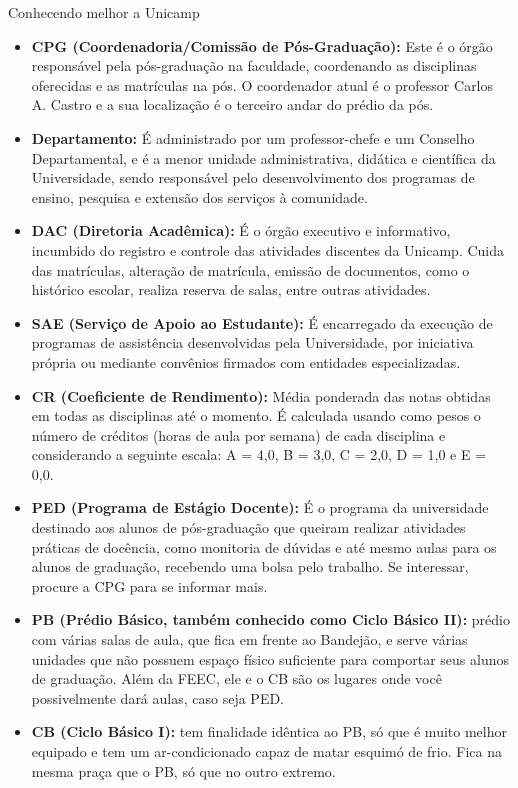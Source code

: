 \begin{story}{Conhecendo melhor a Unicamp}
\begin{itemize}
\item \textbf{CPG (Coordenadoria/Comissão de Pós-Graduação):} Este é o órgão responsável pela pós-graduação na faculdade, coordenando as disciplinas oferecidas e as matrículas na pós. O coordenador atual é o professor Carlos A. Castro e a sua localização é o terceiro andar do prédio da pós.

\item \textbf{Departamento:} É administrado por um professor-chefe e um Conselho Departamental, e é a menor unidade administrativa, didática e científica da Universidade, sendo responsável pelo desenvolvimento dos programas de ensino, pesquisa e extensão dos serviços à comunidade.

\item \textbf{DAC (Diretoria Acadêmica):} É o órgão executivo e informativo, incumbido do registro e controle das atividades discentes da Unicamp. Cuida das matrículas, alteração de matrícula, emissão de documentos, como o histórico escolar, realiza reserva de salas, entre outras atividades.

\item \textbf{SAE (Serviço de Apoio ao Estudante):} É encarregado da execução de programas de assistência desenvolvidas pela Universidade, por iniciativa própria ou mediante convênios firmados com entidades especializadas.

\item \textbf{CR (Coeficiente de Rendimento):} Média ponderada das notas obtidas em todas as disciplinas até o momento. É calculada usando como pesos o número de créditos (horas de aula por semana) de cada disciplina e considerando a seguinte escala: A = 4,0, B = 3,0, C = 2,0, D = 1,0 e E = 0,0.

\item \textbf{PED (Programa de Estágio Docente):} É o programa da universidade destinado aos alunos de pós-graduação que queiram realizar atividades práticas de docência, como monitoria de dúvidas e até mesmo aulas para os alunos de graduação, recebendo uma bolsa pelo trabalho. Se interessar, procure a CPG para se informar mais.

\item \textbf{PB (Prédio Básico, também conhecido como Ciclo Básico II):} prédio com várias salas de aula, que fica em frente ao Bandejão, e serve várias unidades que não possuem espaço físico suficiente para comportar seus alunos de graduação. Além da FEEC, ele e o CB são os lugares onde você possivelmente dará aulas, caso seja PED.

\item \textbf{CB (Ciclo Básico I):} tem finalidade idêntica ao PB, só que é muito melhor equipado e tem um ar-condicionado capaz de matar esquimó de frio. Fica na mesma praça que o PB, só que no outro extremo.
\end{itemize}

\end{story}